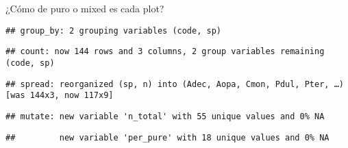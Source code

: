 \documentclass[]{article}
\newenvironment{Shaded}{\begin{snugshade}}{\end{snugshade}}
\newcommand{\CommentTok}[1]{\textcolor[rgb]{0.56,0.35,0.01}{\textit{#1}}}
\newcommand{\DataTypeTok}[1]{\textcolor[rgb]{0.13,0.29,0.53}{#1}}
\newcommand{\DecValTok}[1]{\textcolor[rgb]{0.00,0.00,0.81}{#1}}
\newcommand{\KeywordTok}[1]{\textcolor[rgb]{0.13,0.29,0.53}{\textbf{#1}}}
\newcommand{\NormalTok}[1]{#1}
\newcommand{\OperatorTok}[1]{\textcolor[rgb]{0.81,0.36,0.00}{\textbf{#1}}}
\newcommand{\OtherTok}[1]{\textcolor[rgb]{0.56,0.35,0.01}{#1}}
\newcommand{\StringTok}[1]{\textcolor[rgb]{0.31,0.60,0.02}{#1}}
\begin{document}
¿Cómo de puro o mixed es cada plot?

\begin{Shaded}
\end{Shaded}

\begin{verbatim}
## group_by: 2 grouping variables (code, sp)
\end{verbatim}

\begin{verbatim}
## count: now 144 rows and 3 columns, 2 group variables remaining (code, sp)
\end{verbatim}

\begin{verbatim}
## spread: reorganized (sp, n) into (Adec, Aopa, Cmon, Pdul, Pter, …) [was 144x3, now 117x9]
\end{verbatim}

\begin{Shaded}
\end{Shaded}

\begin{verbatim}
## mutate: new variable 'n_total' with 55 unique values and 0% NA
\end{verbatim}

\begin{verbatim}
##         new variable 'per_pure' with 18 unique values and 0% NA
\end{verbatim}
\end{document}
